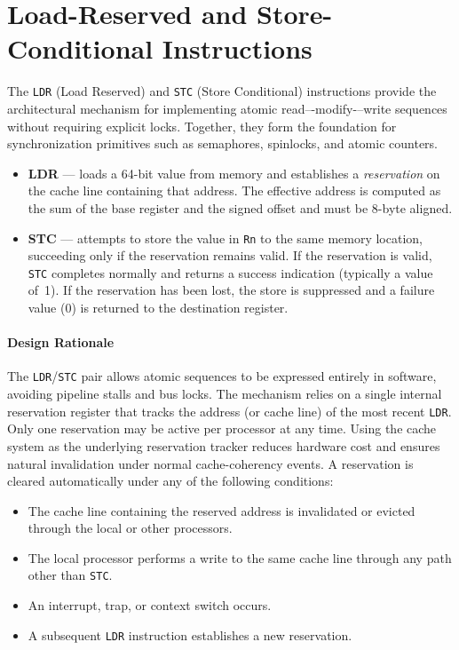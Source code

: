 \section*{Load-Reserved and Store-Conditional Instructions}

The \texttt{LDR} (Load Reserved) and \texttt{STC} (Store Conditional) instructions provide the architectural mechanism for implementing atomic read–-modify-–write sequences without requiring explicit locks. Together, they form the foundation for synchronization primitives such as semaphores, spinlocks, and atomic counters.

\begin{itemize}
  \item \textbf{LDR} — loads a 64-bit value from memory and establishes a \emph{reservation} on the cache line containing that address. The effective address is computed as the sum of the base register and the signed offset and must be 8-byte aligned.   
  \item \textbf{STC} — attempts to store the value in \texttt{Rn} to the same memory location, succeeding only if the reservation remains valid. If the reservation is valid, \texttt{STC} completes normally and returns a success indication (typically a value of~1). If the reservation has been lost, the store is suppressed and a failure value (0) is returned to the destination register.
\end{itemize}

\paragraph{Design Rationale}

The \texttt{LDR}/\texttt{STC} pair allows atomic sequences to be expressed entirely in software, avoiding pipeline stalls and bus locks.  
The mechanism relies on a single internal reservation register that tracks the address (or cache line) of the most recent \texttt{LDR}. Only one reservation may be active per processor at any time. Using the cache system as the underlying reservation tracker reduces hardware cost and ensures natural invalidation under normal cache-coherency events. A reservation is cleared automatically under any of the following conditions:

\begin{itemize}
  \item The cache line containing the reserved address is invalidated or evicted through the local or other processors.
  \item The local processor performs a write to the same cache line through any path other than \texttt{STC}.
  \item An interrupt, trap, or context switch occurs.
  \item A subsequent \texttt{LDR} instruction establishes a new reservation.
\end{itemize}

